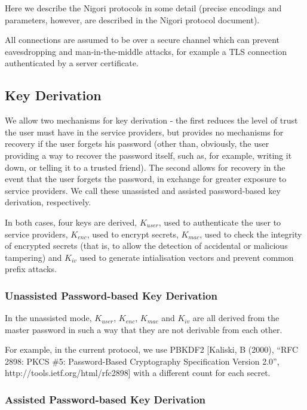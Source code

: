 \documentclass[a4paper,titlepage]{article}
\begin{document}
Here we describe the Nigori protocols in some detail (precise
encodings and parameters, however, are described in the Nigori
protocol document).

All connections are assumed to be over a secure channel which can
prevent eavesdropping and man-in-the-middle attacks, for example a TLS
connection authenticated by a server certificate.

\subsection{Key Derivation}

We allow two mechanisms for key derivation - the first reduces the
level of trust the user must have in the service providers, but
provides no mechanisms for recovery if the user forgets his password
(other than, obviously, the user providing a way to recover the
password itself, such as, for example, writing it down, or telling it
to a trusted friend). The second allows for recovery in the event that
the user forgets the password, in exchange for greater exposure to
service providers. We call these unassisted and assisted
password-based key derivation, respectively.

In both cases, four keys are derived, $K_{user}$, used to
authenticate the user to service providers, $K_{enc}$, used to encrypt
secrets, $K_{mac}$, used to check the integrity of encrypted
secrets (that is, to allow the detection of accidental or malicious
tampering) and $K_{iv}$ used to generate intialisation vectors and
prevent common prefix attacks.

\subsubsection{Unassisted Password-based Key Derivation}


In the unassisted mode, $K_{user}$, $K_{enc}$, $K_{mac}$ and $K_{iv}$ are all derived from the master password in such a way that they are not derivable from each other.

For example, in the current protocol, we use PBKDF2 [Kaliski, B
  (2000), ``RFC 2898: PKCS \#5: Password-Based Cryptography
  Specification Version 2.0'', http://tools.ietf.org/html/rfc2898]
with a different count for each secret.

\subsubsection{Assisted Password-based Key Derivation}
\end{document}
